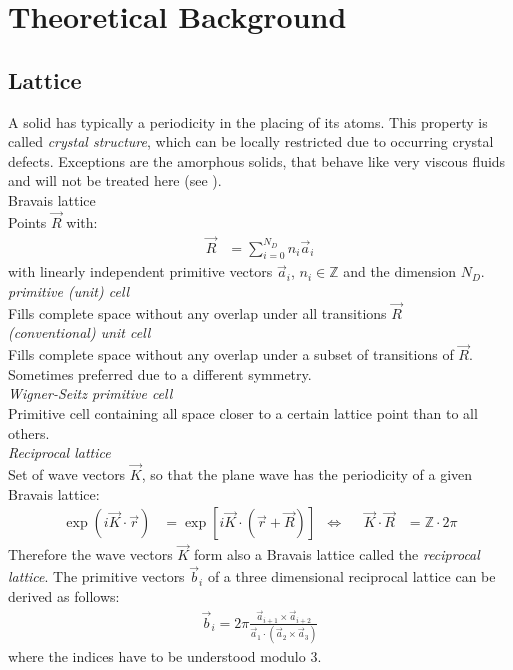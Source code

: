 \section{Theoretical Background}
\subsection{Lattice}
A solid has typically a periodicity in the placing of its atoms. This property is called \emph{crystal structure}, which can be locally restricted due to occurring crystal defects. Exceptions are the amorphous solids, that behave like very viscous fluids and will not be treated here (see \cite{ashcroft, gerthsen}).\\
Bravais lattice\\
Points $\vec{R}$ with:
\begin{align}
	\vec{R} &= \sum_{i = 0}^{N_D} n_i \vec{a}_i
\end{align}
with linearly independent primitive vectors $\vec{a}_i$, $n_i \in \mathbb{Z}$ and the dimension $N_D$.\\

\emph{primitive (unit) cell}\\
Fills complete space without any overlap under all transitions $\vec{R}$\\

\emph{(conventional) unit cell}\\
Fills complete space without any overlap under a subset of transitions of $\vec{R}$. Sometimes preferred due to a different symmetry.\\

\emph{Wigner-Seitz primitive cell}\\
Primitive cell containing all space closer to a certain lattice point than to all others.\\


\emph{Reciprocal lattice}\\
Set of wave vectors $\vec{K}$, so that the plane wave has the periodicity of a given Bravais lattice:
\begin{align}
	\exp\left(i\vec{K}\cdot\vec{r}\right) &= \exp\left[i\vec{K}\cdot\left(\vec{r} + \vec{R}\right)\right] &\Leftrightarrow& &\vec{K}\cdot\vec{R} &= \mathbb{Z}\cdot 2\pi	
\end{align}
Therefore the wave vectors $\vec{K}$ form also a Bravais lattice called the \emph{reciprocal lattice}. The primitive vectors $\vec{b}_i$ of a three dimensional reciprocal lattice can be derived as follows:
\begin{align}
	\vec{b}_i = 2\pi \frac{\vec{a}_{i+1}\times\vec{a}_{i+2}}{\vec{a}_1 \cdot \left(\vec{a}_2 \times \vec{a}_3\right)}
\end{align}
where the indices have to be understood modulo 3.\\

